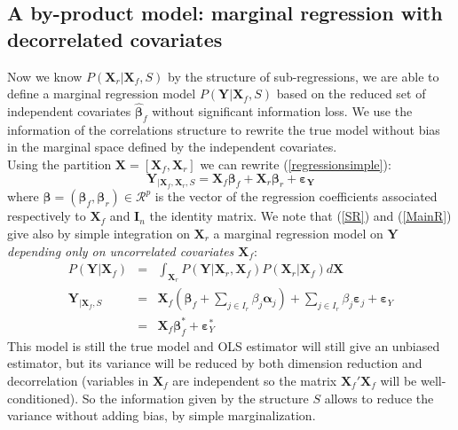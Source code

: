 \documentclass[11pt,a4paper]{article}
\begin{document}
\subsection{A by-product model: marginal regression with decorrelated covariates}
Now we know $P(\boldsymbol{X}_r|\boldsymbol{X}_f,S)$ by the structure of sub-regressions, we are able to define a marginal regression model $P(\boldsymbol{Y}|\boldsymbol{X}_f,S)$ based on the reduced set of independent covariates $\hat{\boldsymbol{\beta}}_f$ without significant information loss. We use the information of the correlations structure to rewrite the true model without bias in the marginal space defined by the independent covariates.
 	\\
Using the partition $\boldsymbol{X}=[\boldsymbol{X}_f,\boldsymbol{X}_r]$ we can rewrite (\ref{regressionsimple}):
	\begin{equation}
			\boldsymbol{Y}_{|\boldsymbol{X}_f,\boldsymbol{X}_r,S}=\boldsymbol{X}_f\boldsymbol{\beta}_f+\boldsymbol{X}_r\boldsymbol{\beta}_r+\boldsymbol{\varepsilon_Y} \label{MainR}
		\end{equation}
		where $\boldsymbol{\beta}=(\boldsymbol{\beta}_f,\boldsymbol{\beta}_r) \in  \mathcal{R}^p$ is the vector of the regression coefficients associated respectively to $\boldsymbol{X}_f$ and $\boldsymbol{I}_n$ the identity matrix. 
We note that (\ref{SR}) and (\ref{MainR}) give also by simple integration on $\boldsymbol{X}_r$ a marginal regression model on $\boldsymbol{Y}$ {\it depending only on uncorrelated covariates $\boldsymbol{X}_f$}:
\begin{eqnarray}
		P(\boldsymbol{Y}|\boldsymbol{X}_f)&=& \int_{\boldsymbol{X}_r}P(\boldsymbol{Y}|\boldsymbol{X}_r,\boldsymbol{X}_f)P(\boldsymbol{X}_r|\boldsymbol{X}_f) d \boldsymbol{X} \\
	\boldsymbol{Y}_{|\boldsymbol{X}_f,S}&=&\boldsymbol{X}_f (\boldsymbol{\beta}_f+ \sum_{j \in I_r}\beta_{j}\boldsymbol{\alpha}_j)+  \sum_{j \in I_r}\beta_{j}\boldsymbol{\varepsilon}_j+\boldsymbol{\varepsilon}_Y \label{Trueexpl} \\
	&=&\boldsymbol{X}_f\boldsymbol{\beta}_f^*+\boldsymbol{\varepsilon}_Y^*\label{modexpl}
\end{eqnarray}
 This model is still the true model and OLS estimator will still give an unbiased estimator, but its variance will be reduced by both dimension reduction and decorrelation (variables in $\boldsymbol{X}_f$ are independent so the matrix $\boldsymbol{X}_f'\boldsymbol{X}_f$ will be well-conditioned). So the information given by the structure $S$ allows to reduce the variance without adding bias, by simple marginalization.
\end{document}
